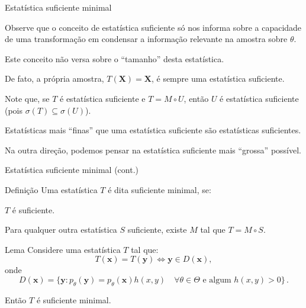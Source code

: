 \documentclass[11pt]{beamer}
\newenvironment{halfwideitemize}{\itemize\addtolength{\itemsep}{0.5em}}{\enditemize}
\newenvironment{halfwideenumerate}{\enumerate\addtolength{\itemsep}{0.5em}}{\endenumerate}
\begin{document}
	\begin{frame}{Estatística suficiente minimal}
		\begin{halfwideitemize}
			\item Observe que o conceito de estatística suficiente só nos informa sobre a capacidade de uma transformação em condensar a informação relevante na amostra sobre $\theta$.
			\item Este conceito não versa sobre o ``tamanho'' desta estatística.
			\begin{halfwideitemize}
				\item De fato, a própria amostra, $T(\boldsymbol{X})=\boldsymbol{X}$, é sempre uma estatística suficiente.
			\end{halfwideitemize}
			\item Note que, se $T$ é estatística suficiente e $T = M\circ U$, então $U$ é estatística suficiente (pois $\sigma(T)\subseteq \sigma(U)$).
			\begin{halfwideitemize}
				\item Estatísticas mais ``finas'' que uma estatística suficiente são estatísticas suficientes.
			\end{halfwideitemize}
			\item Na outra direção, podemos pensar na estatística suficiente mais ``grossa'' possível. 
		\end{halfwideitemize}
	\end{frame}
	\begin{frame}{Estatística suficiente minimal (cont.)}
		\begin{block}{Definição}
			Uma estatística $T$ é dita suficiente minimal, se:
			\begin{halfwideenumerate}
				\item $T$ é suficiente.
				\item Para qualquer outra estatística $S$ suficiente, existe $M$ tal que $T = M \circ S$.
			\end{halfwideenumerate}
		\end{block}
		\begin{block}{Lema}
			Considere uma estatística $T$ tal que:
			$$T(\boldsymbol{x}) = T(\boldsymbol{y}) \iff \boldsymbol{y} \in D(\boldsymbol{x}) , $$
			onde
			$$D(\boldsymbol{x}) = \{\boldsymbol{y}:  p_\theta(\boldsymbol{y}) = p_\theta(\boldsymbol{x}) h(x,y) \quad \forall \theta \in \Theta  \text{ e algum } h(x,y) > 0\}\, .$$
			
			Então $T$ é suficiente minimal.
		\end{block}
	\end{frame}
\end{document}
